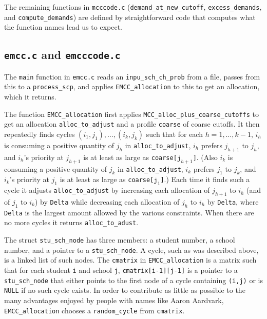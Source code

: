 \documentclass[12pt]{article}
\theoremstyle{definition}
\begin{document}
\begin{appendix}
The remaining functions in \texttt{mcccode.c}
(\texttt{demand\_at\_new\_cutoff}, \texttt{excess\_demands}, and
\texttt{compute\_demands}) are defined by straightforward code that
computes what the function names lead us to expect.

\subsection{\texttt{emcc.c} and \texttt{emcccode.c}}

The \texttt{main} function in \texttt{emcc.c} reads an
\texttt{inpu\_sch\_ch\_prob} from a file, passes from this to a
\texttt{process\_scp}, and applies \texttt{EMCC\_allocation} to this
to get an allocation, which it returns.

The function \texttt{EMCC\_allocation} first applies
\texttt{MCC\_alloc\_plus\_coarse\_cutoffs} to get an allocation
\texttt{alloc\_to\_adjust} and a profile \texttt{coarse} of coarse
cutoffs.  It then repeatedly finds cycles $(i_1,j_1), \ldots,
(i_k,j_k)$ such that for each $h = 1, \ldots, k-1$, $i_h$ is consuming
a positive quantity of $j_h$ in \texttt{alloc\_to\_adjust}, $i_h$
prefers $j_{h+1}$ to $j_h$, and $i_h$'s priority at $j_{h+1}$ is at
least as large as \texttt{coarse[$\texttt{j}_{h+1}$]}.  (Also $i_k$ is
consuming a positive quantity of $j_k$ in \texttt{alloc\_to\_adjust},
$i_k$ prefers $j_1$ to $j_k$, and $i_k$'s priority at $j_1$ is at
least as large as \texttt{coarse[$\texttt{j}_1$]}.)  Each time it
finds such a cycle it adjusts \texttt{alloc\_to\_adjust} by increasing
each allocation of $j_{h+1}$ to $i_h$ (and of $j_1$ to $i_k$) by
\texttt{Delta} while decreasing each allocation of $j_h$ to $i_h$ by
\texttt{Delta}, where \texttt{Delta} is the largest amount allowed by
the various constraints.  When there are no more cycles it returns
\texttt{alloc\_to\_adust}.

The struct \texttt{stu\_sch\_node} has three members: a student
number, a school number, and a pointer to a \texttt{stu\_sch\_node}.
A cycle, such as was described above, is a linked list of such
nodes. The \texttt{cmatrix} in \texttt{EMCC\_allocation} is a matrix
such that for each student \texttt{i} and school \texttt{j},
\texttt{cmatrix[i-1][j-1]} is a pointer to a \texttt{stu\_sch\_node}
that either points to the first node of a cycle containing
\texttt{(i,j)} or is \texttt{NULL} if no such cycle exists.  In order
to contribute as little as possible to the many advantages enjoyed by
people with names like Aaron Aardvark, \texttt{EMCC\_allocation}
chooses a \texttt{random\_cycle} from \texttt{cmatrix}.


\end{appendix}
\end{document}
